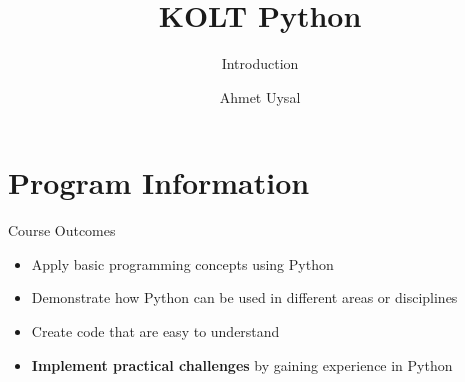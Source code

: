 

\usepackage{../KU-Beamer-Template/style/koc}
\usepackage{minted}
\usepackage{upquote}


\title{KOLT Python}
\subtitle{Introduction}
\date{}
\author{Ahmet Uysal}




  \maketitle


	\section{Program Information}

	\begin{frame}{Course Outcomes}
		\LARGE
		\begin{itemize}
			\item Apply basic programming concepts using Python
			\item Demonstrate how Python can be used in different areas or disciplines
			\item Create code that are easy to understand
			\item \textbf{Implement practical challenges} by gaining experience in Python
		\end{itemize}
	\end{frame}

